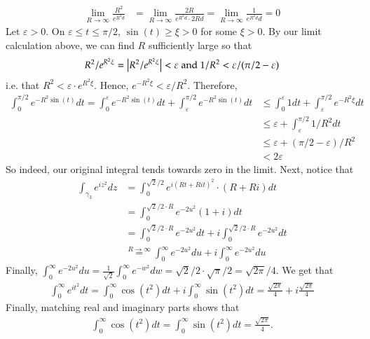 \documentclass[12pt]{article}
\def \ve{\varepsilon}
\theoremstyle{definition}
\theoremstyle{remark}
\renewcommand{\leq}{\leqslant}
\renewcommand{\geq}{\geqslant}
\begin{document}
\begin{enumerate}[leftmargin=\labelsep]
		\begin{align*}
			\lim_{R \to \infty} \frac{R^2}{e^{R^2d}} &= \lim_{R \to \infty} \frac{2R}{e^{R^2d} \cdot 2Rd} = \lim_{R\to \infty} \frac1{e^{R^2d}d} = 0
		\end{align*}
		Let $\ve > 0$. On $\ve \leq t \leq \pi/2$, $\sin(t) \geq \xi > 0$ for some $\xi > 0$. By our limit calculation above, we can find $R$ sufficiently large so that 
		\begin{align*}
			R^2/e^{R^2 \xi} = \qty|R^2/e^{R^2 \xi}| < \ve \text{ and } 1/R^2 < \ve/(\pi/2 - \ve)
		\end{align*}
		i.e. that $R^2 < \ve \cdot e^{R^2 \xi}$. Hence, $e^{-R^2 \xi} < \ve / R^2$. Therefore,
		\begin{align*}
			\int_0^{\pi/2} e^{-R^2\sin(t)} dt = \int_0^\ve e^{-R^2\sin(t)}dt + \int_\ve^{\pi/2} e^{-R^2\sin(t)}dt &\leq \int_0^\ve 1dt + \int_\ve^{\pi/2} e^{-R^2\xi}dt \\
			&\leq \ve + \int_\ve^{\pi/2} 1/R^2 dt \\
			&\leq \ve + (\pi/2 - \ve)/R^2 \\
			&< 2\ve
		\end{align*}
		So indeed, our original integral tends towards zero in the limit. Next, notice that
		\begin{align*}
			\int_{\gamma_3} e^{iz^2}dz &= \int_0^{\sqrt{2}/2} e^{i(Rt+Rit)^2} \cdot (R+Ri)dt \\
			&= \int_0^{\sqrt{2}/2 \cdot R} e^{-2u^2}(1+i)dt \\
			&= \int_0^{\sqrt{2}/2 \cdot R} e^{-2u^2}dt + i\int_0^{\sqrt{2}/2 \cdot R} e^{-2u^2}dt \\
			&\overset{R \to \infty}{=} \int_0^\infty e^{-2u^2}du + i \int_0^{\infty} e^{-2u^2}du
		\end{align*}
		Finally, $\int_0^{\infty} e^{-2u^2}du = \frac1{\sqrt{2}} \int_0^\infty e^{-w^2}dw = \sqrt{2}/2 \cdot \sqrt{\pi}/2 = \sqrt{2\pi}/4$. We get that
		\begin{align*}
			\int_0^\infty e^{it^2}dt = \int_0^\infty \cos(t^2)dt + i\int_0^\infty \sin(t^2)dt = \frac{\sqrt{2\pi}}4 + i\frac{\sqrt{2\pi}}4
		\end{align*}
		Finally, matching real and imaginary parts shows that 
		\begin{align*}
			\int_0^\infty \cos(t^2)dt = \int_0^\infty \sin(t^2)dt = \frac{\sqrt{2\pi}}{4}.
		\end{align*}
	\end{enumerate}
\end{document}
